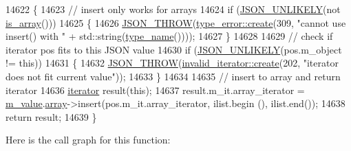 \begin{DoxyCode}
14622     \{
14623         \textcolor{comment}{// insert only works for arrays}
14624         \textcolor{keywordflow}{if} (\hyperlink{json_8hpp_ab77582407c64944e7db1ea95ab520253}{JSON\_UNLIKELY}(not \hyperlink{classnlohmann_1_1basic__json_aef9ce5dd2381caee1f8ddcdb5bdd9c65}{is\_array}()))
14625         \{
14626             \hyperlink{json_8hpp_a6c274f6db2e65c1b66c7d41b06ad690f}{JSON\_THROW}(\hyperlink{classnlohmann_1_1detail_1_1type__error_aecc083aea4b698c33d042670ba50c10f}{type\_error::create}(309, \textcolor{stringliteral}{"cannot use insert() with "} + 
      std::string(\hyperlink{classnlohmann_1_1basic__json_a9d0a478571f82f0163b96b2424cd998f}{type\_name}())));
14627         \}
14628 
14629         \textcolor{comment}{// check if iterator pos fits to this JSON value}
14630         \textcolor{keywordflow}{if} (\hyperlink{json_8hpp_ab77582407c64944e7db1ea95ab520253}{JSON\_UNLIKELY}(pos.m\_object != \textcolor{keyword}{this}))
14631         \{
14632             \hyperlink{json_8hpp_a6c274f6db2e65c1b66c7d41b06ad690f}{JSON\_THROW}(\hyperlink{classnlohmann_1_1detail_1_1invalid__iterator_a4e849260a3caa1b288c7e619130c6c09}{invalid\_iterator::create}(202, \textcolor{stringliteral}{"iterator does not
       fit current value"}));
14633         \}
14634 
14635         \textcolor{comment}{// insert to array and return iterator}
14636         \hyperlink{classnlohmann_1_1basic__json_a099316232c76c034030a38faa6e34dca}{iterator} result(\textcolor{keyword}{this});
14637         result.m\_it.array\_iterator = \hyperlink{classnlohmann_1_1basic__json_aeb0814f76966f99290cb29e127c90a77}{m\_value}.\hyperlink{unionnlohmann_1_1basic__json_1_1json__value_a7947687f3ae1911d6e9847e2b3226157}{array}->insert(pos.m\_it.array\_iterator, ilist.begin
      (), ilist.end());
14638         \textcolor{keywordflow}{return} result;
14639     \}
\end{DoxyCode}
Here is the call graph for this function\+:
\mbox{\label{classnlohmann_1_1basic__json_a1b0a4e60d56f1fe80501ed941e122892}} 
